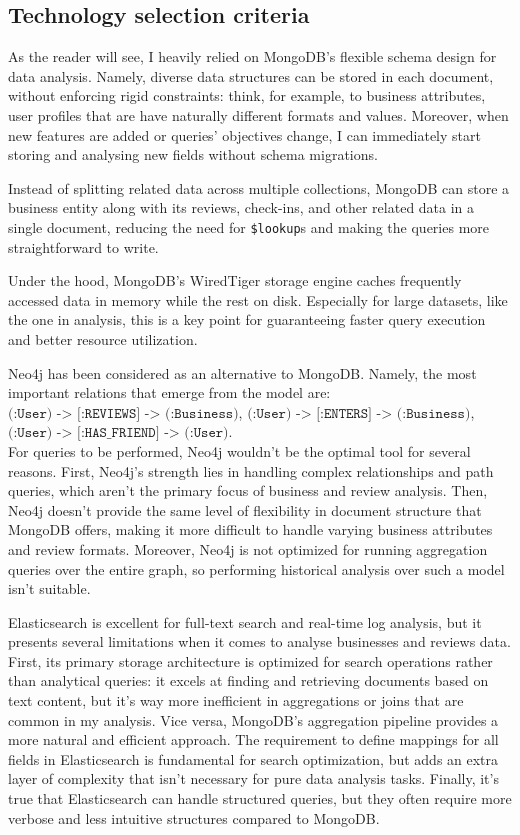 \documentclass{Configuration_Files/PoliMi3i_thesis}
\begin{document}
\subsection{Technology selection criteria}
As the reader will see, I heavily relied on MongoDB's flexible schema design for data analysis. Namely, diverse data structures can be stored in each document, without enforcing rigid constraints: think, for example, to business attributes, user profiles that are have naturally different formats and values. Moreover, when new features are added or queries' objectives change, I can immediately start storing and analysing new fields without schema migrations.

Instead of splitting related data across multiple collections, MongoDB can store a business entity along with its reviews, check-ins, and other related data in a single document, reducing the need for \texttt{\$lookup}s and making the queries more straightforward to write. 

Under the hood, MongoDB's WiredTiger storage engine caches frequently accessed data in memory while the rest on disk. Especially for large datasets, like the one in analysis, this is a key point for guaranteeing faster query execution and better resource utilization.


Neo4j has been considered as an alternative to MongoDB. Namely, the most important relations that emerge from the model are: $\texttt{(:User) -> [:REVIEWS] -> (:Business)}$,  $\texttt{(:User) -> [:ENTERS] -> (:Business)}$,  $\texttt{(:User) -> [:HAS\_FRIEND] -> (:User)}$. \\ For queries to be performed, Neo4j wouldn't be the optimal tool for several reasons. First, Neo4j's strength lies in handling complex relationships and path queries, which aren't the primary focus of business and review analysis. Then, Neo4j doesn't provide the same level of flexibility in document structure that MongoDB offers, making it more difficult to handle varying business attributes and review formats. Moreover, Neo4j is not optimized for running aggregation queries over the entire graph, so performing historical analysis over such a model isn't suitable.


Elasticsearch is excellent for full-text search and real-time log analysis, but it presents several limitations when it comes to analyse businesses and reviews data. First, its primary storage architecture is optimized for search operations rather than analytical queries: it excels at finding and retrieving documents based on text content, but it's way more inefficient in aggregations or joins that are common in my analysis. Vice versa, MongoDB's aggregation pipeline provides a more natural and efficient approach. 
The requirement to define mappings for all fields in Elasticsearch is fundamental for search optimization, but adds an extra layer of complexity that isn't necessary for pure data analysis tasks.
Finally, it's true that Elasticsearch can handle structured queries, but they often require more verbose and less intuitive structures compared to MongoDB.
\end{document}

